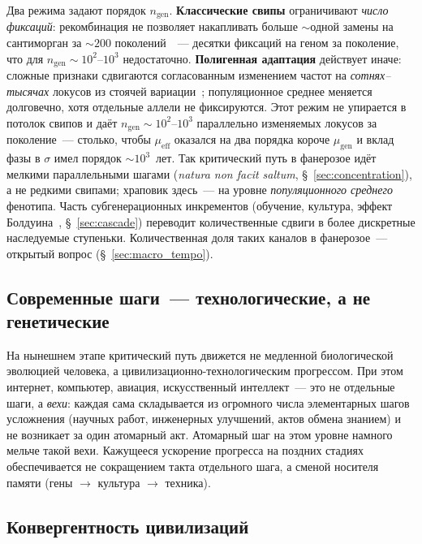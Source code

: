 \documentclass[12pt,a4paper]{article}
\begin{document}
Два режима задают порядок $n_{\mathrm{gen}}$. \textbf{Классические свипы} ограничивают \emph{число фиксаций}: рекомбинация не позволяет накапливать больше $\sim$одной замены на сантиморган за $\sim200$ поколений~\cite{WeissmanBarton2012}~--- десятки фиксаций на геном за поколение, что для $n_{\mathrm{gen}}\sim10^2$--$10^3$ недостаточно. \textbf{Полигенная адаптация} действует иначе: сложные признаки сдвигаются согласованным изменением частот на \emph{сотнях--тысячах} локусов из стоячей вариации~\cite{Pritchard2010,Boyle2017,Barghi2020}; популяционное среднее меняется долговечно, хотя отдельные аллели не фиксируются. Этот режим не упирается в потолок свипов и даёт $n_{\mathrm{gen}}\sim10^2$--$10^3$ параллельно изменяемых локусов за поколение~--- столько, чтобы $\mu_{\mathrm{eff}}$ оказался на два порядка короче $\mu_{\mathrm{gen}}$ и вклад фазы в $\sigma$ имел порядок $\sim10^3$~лет. Так критический путь в фанерозое идёт мелкими параллельными шагами (\emph{natura non facit saltum}, \S~\ref{sec:concentration}), а не редкими свипами; храповик здесь~--- на уровне \emph{популяционного среднего} фенотипа. Часть субгенерационных инкрементов (обучение, культура, эффект Болдуина~\cite{Baldwin1896}, \S~\ref{sec:cascade}) переводит количественные сдвиги в более дискретные наследуемые ступеньки. Количественная доля таких каналов в фанерозое~--- открытый вопрос (\S~\ref{sec:macro_tempo}).

\subsection{Современные шаги~--- технологические, а не генетические}
\label{sec:modern_steps}

На нынешнем этапе критический путь движется не медленной биологической эволюцией человека, а цивилизационно-технологическим прогрессом. При этом интернет, компьютер, авиация, искусственный интеллект~--- это не отдельные шаги, а \emph{вехи}: каждая сама складывается из огромного числа элементарных шагов усложнения (научных работ, инженерных улучшений, актов обмена знанием) и не возникает за один атомарный акт. Атомарный шаг на этом уровне намного мельче такой вехи. Кажущееся ускорение прогресса на поздних стадиях обеспечивается не сокращением такта отдельного шага, а сменой носителя памяти (гены $\to$ культура $\to$ техника).

\subsection{Конвергентность цивилизаций}
\label{sec:time_form}
\end{document}
